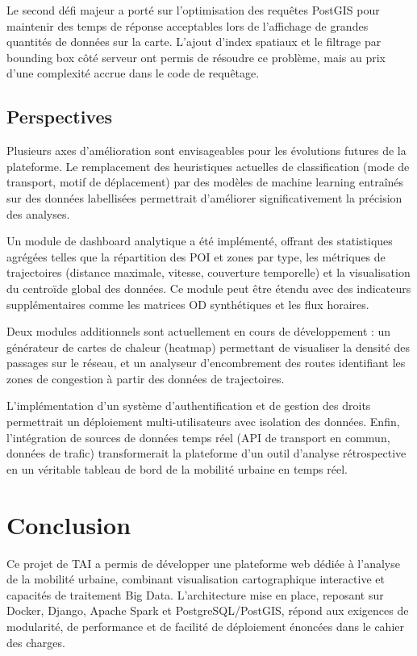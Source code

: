 \documentclass[french]{tai_info} %
\begin{document}
Le second défi majeur a porté sur l'optimisation des requêtes PostGIS pour maintenir des temps de réponse acceptables lors de l'affichage de grandes quantités de données sur la carte. L'ajout d'index spatiaux et le filtrage par bounding box côté serveur ont permis de résoudre ce problème, mais au prix d'une complexité accrue dans le code de requêtage.

\subsection{Perspectives}

Plusieurs axes d'amélioration sont envisageables pour les évolutions futures de la plateforme. Le remplacement des heuristiques actuelles de classification (mode de transport, motif de déplacement) par des modèles de machine learning entraînés sur des données labellisées permettrait d'améliorer significativement la précision des analyses.

Un module de dashboard analytique a été implémenté, offrant des statistiques agrégées telles que la répartition des POI et zones par type, les métriques de trajectoires (distance maximale, vitesse, couverture temporelle) et la visualisation du centroïde global des données. Ce module peut être étendu avec des indicateurs supplémentaires comme les matrices OD synthétiques et les flux horaires.

Deux modules additionnels sont actuellement en cours de développement : un générateur de cartes de chaleur (heatmap) permettant de visualiser la densité des passages sur le réseau, et un analyseur d'encombrement des routes identifiant les zones de congestion à partir des données de trajectoires.

L'implémentation d'un système d'authentification et de gestion des droits permettrait un déploiement multi-utilisateurs avec isolation des données. Enfin, l'intégration de sources de données temps réel (API de transport en commun, données de trafic) transformerait la plateforme d'un outil d'analyse rétrospective en un véritable tableau de bord de la mobilité urbaine en temps réel.

\section{Conclusion}

Ce projet de TAI a permis de développer une plateforme web dédiée à l'analyse de la mobilité urbaine, combinant visualisation cartographique interactive et capacités de traitement Big Data. L'architecture mise en place, reposant sur Docker, Django, Apache Spark et PostgreSQL/PostGIS, répond aux exigences de modularité, de performance et de facilité de déploiement énoncées dans le cahier des charges.
\end{document}
